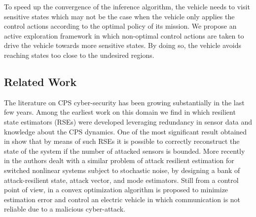 \documentclass[letterpaper, 10 pt, conference]{ieeeconf}  %
\newcommand\NB[1]{$\spadesuit$\footnote{NB: #1}}
\begin{document}
To speed up the convergence of the inference algorithm, the vehicle needs to visit sensitive states which may not be the case when the vehicle only applies the control actions according to the optimal policy of its mission. We propose an active exploration framework in which non-optimal control actions are taken to drive the vehicle towards more sensitive states. By doing so, the vehicle avoids reaching states too close to the undesired regions.%


\subsection{Related Work}\label{subsec:related}

The literature on CPS cyber-security has been growing substantially in the last few years. 
Among the earliest work on this domain we find \cite{fawzi2014secure, ivanov2014attack, pajic2014robustness, bezzo2014attack} in which resilient state estimators (RSEs) were developed leveraging redundancy in sensor data and knowledge about the CPS dynamics. One of the most significant result obtained in \cite{fawzi2014secure, pajic2014robustness} show that by means of such RSEs it is possible to correctly reconstruct the state of the system if the number of attacked sensors is bounded.
More recently in \cite{kim2017attack} the authors dealt with a similar problem of attack resilient estimation for switched nonlinear systems subject to stochastic noise, by designing a bank of attack-resilient state, attack vector, and mode estimators. Still from a control point of view, in \cite{rana2017attack} a convex optimization algorithm is proposed to minimize estimation error and control an electric vehicle in which communication is not reliable due to a malicious cyber-attack. 
\end{document}
